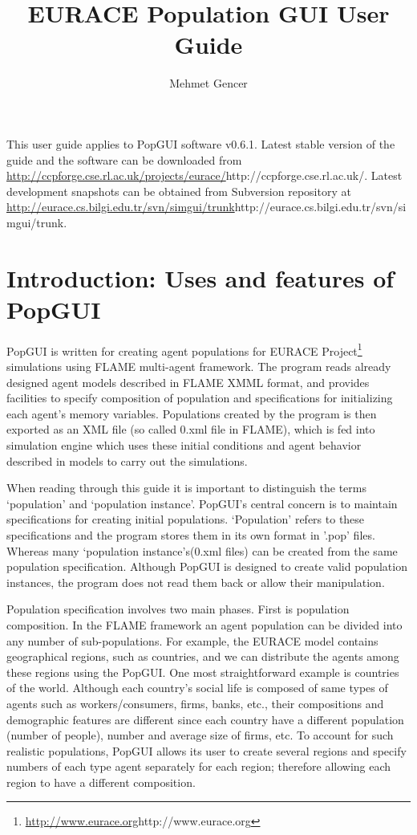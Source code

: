 \documentclass[10pt]{article}
\begin{document}
\newcommand{\example}[1]{``{\tt #1}''}
\newcommand{\screenshot}[1]{\texttt{[image: screenshots/\#1.jpg]}}

\title{EURACE Population GUI User Guide}
\author{Mehmet Gencer}
\maketitle

This user guide applies to PopGUI software v0.6.1. Latest stable version of the guide and the software can be downloaded from \url{http://ccpforge.cse.rl.ac.uk/projects/eurace/}{http://ccpforge.cse.rl.ac.uk/}. Latest development snapshots can be obtained from Subversion repository at \url{http://eurace.cs.bilgi.edu.tr/svn/simgui/trunk}{http://eurace.cs.bilgi.edu.tr/svn/simgui/trunk}.

\tableofcontents

\newpage
\section{Introduction: Uses and features of PopGUI}
PopGUI is written for creating agent populations for EURACE  Project\footnote{\url{http://www.eurace.org}{http://www.eurace.org}} simulations using FLAME multi-agent framework. The program reads already designed agent models described in FLAME XMML format, and provides facilities to specify composition of population and specifications for initializing each agent's memory variables. Populations created by the program is then exported as an XML file (so called 0.xml file in FLAME), which is fed into simulation engine which uses these initial conditions and agent behavior described in models to carry out the simulations.

When reading through this guide it is important to distinguish the terms `population' and `population instance'. PopGUI's central concern is to maintain specifications for creating initial populations. `Population' refers to these specifications and the program stores them in its own format in '.pop' files. Whereas many `population instance's(0.xml files) can be created from the same population specification. Although PopGUI is designed to create valid population instances, the program does not read them back or allow their manipulation.

Population specification involves two main phases. First is population composition. In the FLAME framework an agent population can be divided into any number of sub-populations. For example, the EURACE model contains geographical regions, such as countries, and we can distribute the agents among these regions using the PopGUI. One most straightforward example is countries of the world. Although each country's social life is composed of same types of agents such as workers/consumers, firms, banks, etc., their compositions and demographic features are different since each country have a different population (number of people), number and average size of firms, etc. To account for such realistic populations, PopGUI allows its user to create several regions and specify numbers of each type agent separately for each region; therefore allowing each region to have a different composition.
\end{document}
